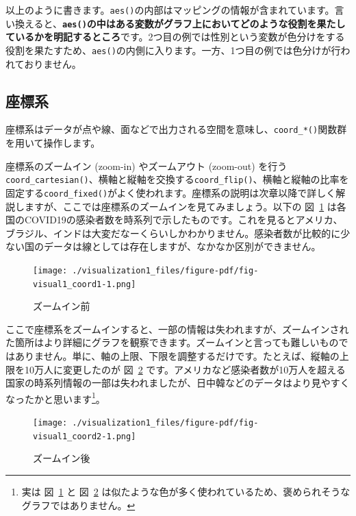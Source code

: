 \documentclass[
  a4paper,
  pandoc,
  ja=standard,
  jafont=haranoaji]{bxjsbook}
\begin{document}
以上のように書きます。\texttt{aes()}の内部はマッピングの情報が含まれています。言い換えると、\textbf{\texttt{aes()}の中はある変数がグラフ上においてどのような役割を果たしているかを明記するところ}です。2つ目の例では性別という変数が色分けをする役割を果たすため、\texttt{aes()}の内側に入ります。一方、1つ目の例では色分けが行われておりません。

\hypertarget{ux5ea7ux6a19ux7cfb}{%
\subsection{座標系}\label{ux5ea7ux6a19ux7cfb}}

座標系はデータが点や線、面などで出力される空間を意味し、\texttt{coord\_*()}関数群を用いて操作します。

座標系のズームイン (zoom-in) やズームアウト (zoom-out)
を行う\texttt{coord\_cartesian()}、横軸と縦軸を交換する\texttt{coord\_flip()}、横軸と縦軸の比率を固定する\texttt{coord\_fixed()}がよく使われます。座標系の説明は次章以降で詳しく解説しますが、ここでは座標系のズームインを見てみましょう。以下の
図~\ref{fig-visual1_coord1}
は各国のCOVID19の感染者数を時系列で示したものです。これを見るとアメリカ、ブラジル、インドは大変だなーくらいしかわかりません。感染者数が比較的に少ない国のデータは線としては存在しますが、なかなか区別ができません。

\begin{figure}

{\centering \texttt{[image: ./visualization1\_files/figure-pdf/fig-visual1\_coord1-1.png]}

}

\caption{\label{fig-visual1_coord1}ズームイン前}

\end{figure}

ここで座標系をズームインすると、一部の情報は失われますが、ズームインされた箇所はより詳細にグラフを観察できます。ズームインと言っても難しいものではありません。単に、軸の上限、下限を調整するだけです。たとえば、縦軸の上限を10万人に変更したのが
図~\ref{fig-visual1_coord2}
です。アメリカなど感染者数が10万人を超える国家の時系列情報の一部は失われましたが、日中韓などのデータはより見やすくなったかと思います\footnote{実は
  図~\ref{fig-visual1_coord1} と 図~\ref{fig-visual1_coord2}
  は似たような色が多く使われているため、褒められそうなグラフではありません。}。

\begin{figure}

{\centering \texttt{[image: ./visualization1\_files/figure-pdf/fig-visual1\_coord2-1.png]}

}

\caption{\label{fig-visual1_coord2}ズームイン後}

\end{figure}
\end{document}
